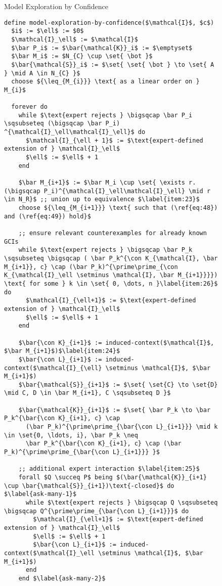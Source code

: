 \begin{figure}[tp]
  \begin{Algorithm}
    \label{alg:model-exploration-by-confidence} Model Exploration by Confidence
    \begin{lstlisting}
define model-exploration-by-confidence($\mathcal{I}$, $c$)
  $i$ := $\ell$ := $0$
  $\mathcal{I}_\ell$ := $\mathcal{I}$
  $\bar P_i$ := $\bar{\mathcal{K}}_i$ := $\emptyset$
  $\bar M_i$ := $N_{C} \cup \set{ \bot }$
  $\bar{\mathcal{S}}_i$ := $\set{ \set{ \bot } \to \set{ A } \mid A \in N_{C} }$
  choose ${\leq_{M_{i}}} \text{ as a linear order on } M_{i}$

  forever do
    while $\text{expert rejects } \bigsqcap \bar P_i \sqsubseteq (\bigsqcap \bar P_i) ^{\mathcal{I}_\ell\mathcal{I}_\ell}$ do
      $\mathcal{I}_{\ell + 1}$ := $\text{expert-defined extension of } \mathcal{I}_\ell$
      $\ell$ := $\ell$ + 1
    end

    $\bar M_{i+1}$ := $\bar M_i \cup \set{ \exists r. (\bigsqcap P_i)^{\mathcal{I}_\ell\mathcal{I}_\ell} \mid r \in N_R}$ ;; union up to equivalence $\label{item:23}$
    choose ${\leq_{M_{i+1}}} \text{ such that (\ref{eq:48}) and (\ref{eq:49}) hold}$

    ;; ensure relevant counterexamples for already known GCIs
    while $\text{expert rejects } \bigsqcap \bar P_k \sqsubseteq \bigsqcap ( \bar P_k^{\con K_{\mathcal{I}, \bar M_{i+1}}, c} \cap (\bar P_k)^{\prime\prime_{\con K_{\mathcal{I}_\ell \setminus \mathcal{I}, \bar M_{i+1}}}}) \text{ for some } k \in \set{ 0, \dots, n }\label{item:26}$ do
      $\mathcal{I}_{\ell+1}$ := $\text{expert-defined extension of } \mathcal{I}_\ell$
      $\ell$ := $\ell$ + 1
    end

    $\bar{\con K}_{i+1}$ := induced-context($\mathcal{I}$, $\bar M_{i+1}$)$\label{item:24}$
    $\bar{\con L}_{i+1}$ := induced-context($\mathcal{I}_{\ell} \setminus \mathcal{I}$, $\bar M_{i+1}$)  
    $\bar{\mathcal{S}}_{i+1}$ := $\set{ \set{C} \to \set{D} \mid C, D \in \bar M_{i+1}, C \sqsubseteq D }$

    $\bar{\mathcal{K}}_{i+1}$ := $\set{ \bar P_k \to \bar P_k^{\bar{\con K}_{i+1}, c} \cap
      (\bar P_k)^{\prime\prime_{\bar{\con L}_{i+1}}} \mid k \in \set{0, \ldots, i}, \bar P_k \neq
      \bar P_k^{\bar{\con K}_{i+1}, c} \cap (\bar P_k)^{\prime\prime_{\bar{\con L}_{i+1}}} }$

    ;; additional expert interaction $\label{item:25}$
    forall $Q \succeq P$ being $(\bar{\mathcal{K}}_{i+1} \cup \bar{\mathcal{S}}_{i+1})\text{-closed}$ do $\label{ask-many-1}$
      while $\text{expert rejects } \bigsqcap Q \sqsubseteq \bigsqcap Q^{\prime\prime_{\bar{\con L}_{i+1}}}$ do
        $\mathcal{I}_{\ell+1}$ := $\text{expert-defined extension of } \mathcal{I}_\ell$
        $\ell$ := $\ell$ + 1
        $\bar{\con L}_{i+1}$ := induced-context($\mathcal{I}_\ell \setminus \mathcal{I}$, $\bar M_{i+1}$)
      end
    end $\label{ask-many-2}$


\end{lstlisting}
\end{Algorithm}
\end{figure}
